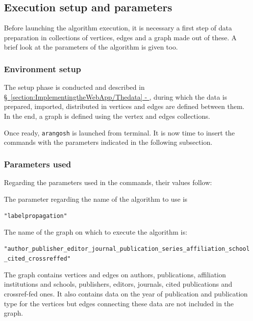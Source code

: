 \subsection{Execution setup and parameters} \label{subsection:CommunityDetection/ClusteringcollaborationcommunitiesAlgorithmexecution/Executionsetupandparameters}
Before launching the algorithm execution, it is necessary a first step of data preparation in collections of vertices, edges and a graph made out of these.
A brief look at the parameters of the algorithm is given too.

\subsubsection{Environment setup} \label{subsubsection:CommunityDetection/ClusteringcollaborationcommunitiesAlgorithmexecution/Executionsetupandparameters/Environmentsetup}
The setup phase is conducted and described in \hyperref[section:ImplementingtheWebApp/Thedata]{\S\ \ref{section:ImplementingtheWebApp/Thedata} - }, during which the data is prepared, imported, distributed in vertices and edges are defined between them. In the end, a graph is defined using the vertex and edges collections.

Once ready, \texttt{arangosh} is launched from terminal. It is now time to insert the commands with the parameters indicated in the following subsection.

\subsubsection{Parameters used} \label{subsubsection:CommunityDetection/ClusteringcollaborationcommunitiesAlgorithmexecution/Executionsetupandparameters/Parametersused}
Regarding the parameters used in the commands, their values follow:

The parameter regarding the name of the algorithm to use is

\noindent\colorbox{lightestgray}{
	\parbox{1\linewidth-9pt}{%
		\texttt{"labelpropagation"}
	}%
}%

The name of the graph on which to execute the algorithm is:

\noindent\colorbox{lightestgray}{
	\parbox{1\linewidth-9pt}{%
		\texttt{"author\_publisher\_editor\_journal\_publication\_series\_affiliation\_school\_cited\_crossreffed"}
	}%
}%

\noindent The graph contains vertices and edges on authors, publications, affiliation institutions and schools, publishers, editors, journals, cited publications and crossref-fed ones. It also contains data on the year of publication and publication type for the vertices but edges connecting these data are not included in the graph.

